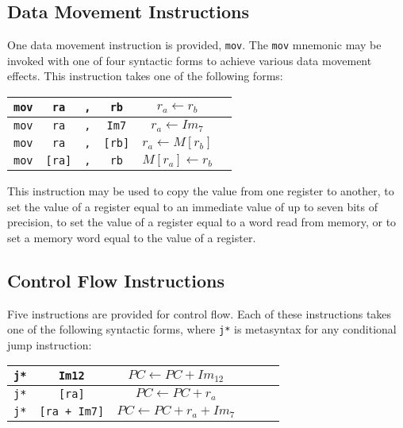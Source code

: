 \documentclass{article}
\begin{document}
\subsection{Data Movement Instructions}

One data movement instruction is provided, \texttt{mov}. The \texttt{mov}
mnemonic may be invoked with one of four syntactic forms to achieve various data
movement effects. This instruction takes one of the following forms:

\begin{center}
\begin{tabular}{|c|c|c|c|c|c|}
\hline
\texttt{mov} & \texttt{ra} &\texttt{,} & \texttt{rb} & $r_{a} \leftarrow r_{b}$ \\ \hline
\texttt{mov} & \texttt{ra} &\texttt{,} & \texttt{Im7} & $r_{a} \leftarrow Im_{7}$ \\ \hline
\texttt{mov} & \texttt{ra} &\texttt{,} & \texttt{[rb]} & $r_{a} \leftarrow M[r_{b}]$ \\ \hline
\texttt{mov} & \texttt{[ra]} &\texttt{,} & \texttt{rb} & $M[r_{a}] \leftarrow r_{b}$ \\ \hline
\end{tabular}
\end{center}

This instruction may be used to copy the value from one register to another, to
set the value of a register equal to an immediate value of up to seven bits of
precision, to set the value of a register equal to a word read from memory, or
to set a memory word equal to the value of a register.

\subsection{Control Flow Instructions}

Five instructions are provided for control flow. Each of these instructions
takes one of the following syntactic forms, where \texttt{j*} is metasyntax for
any conditional jump instruction:

\begin{center}
\begin{tabular}{|c|c|c|c|c|c|}
\hline
\texttt{j*} & \texttt{Im12} & $PC \leftarrow PC + Im_{12}$ \\ \hline
\texttt{j*} & \texttt{[ra]} & $PC \leftarrow PC + r_{a}$ \\ \hline
\texttt{j*} & \texttt{[ra + Im7]} & $PC \leftarrow PC + r_{a} + Im_{7}$ \\ \hline
\end{tabular}
\end{center}
\end{document}
